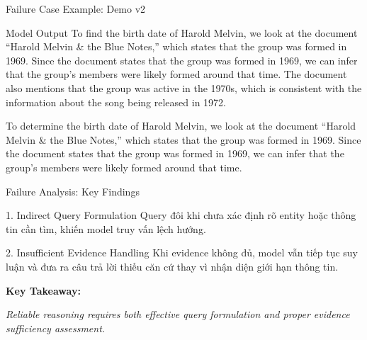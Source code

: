 \begin{frame}{Failure Case Example: Demo v2}
\begin{block}{Model Output}
    To find the birth date of Harold Melvin, we look at the document
    ``Harold Melvin \& the Blue Notes,'' which states that the group
    was formed in 1969. Since the document states that the group was
    formed in 1969, we can infer that the group's members were likely
    formed around that time. The document also mentions that the
    group was active in the 1970s, which is consistent with the
    information about the song being released in 1972.

    \vspace{0.08cm}

    To determine the birth date of Harold Melvin, we look at the
    document ``Harold Melvin \& the Blue Notes,'' which states that
    the group was formed in 1969. Since the document states that
    the group was formed in 1969, we can infer that the group's
    members were likely formed around that time.
\end{block}

\end{frame}


\begin{frame}{Failure Analysis: Key Findings}

\small

\begin{block}{1. Indirect Query Formulation}
    Query đôi khi chưa xác định rõ entity hoặc thông tin cần tìm,
    khiến model truy vấn lệch hướng.
\end{block}

\vspace{0.15cm}

\begin{block}{2. Insufficient Evidence Handling}
    Khi evidence không đủ, model vẫn tiếp tục suy luận và đưa ra
    câu trả lời thiếu căn cứ thay vì nhận diện giới hạn thông tin.
\end{block}

\vspace{0.2cm}

\textbf{Key Takeaway:}

\textit{Reliable reasoning requires both effective query formulation
and proper evidence sufficiency assessment.}

\end{frame}